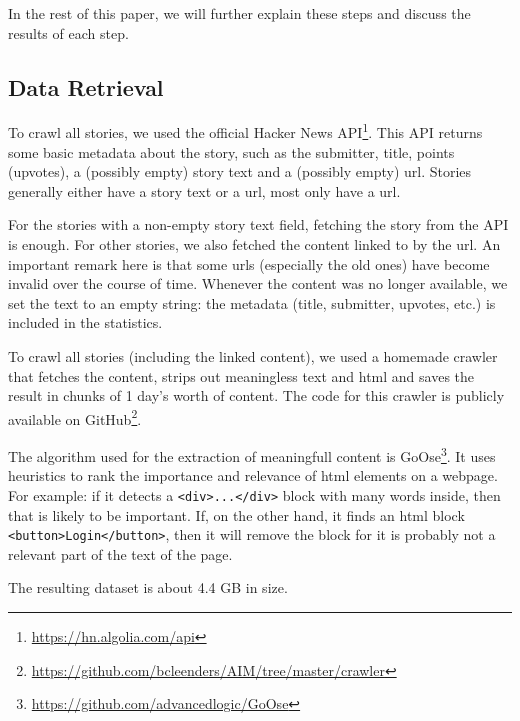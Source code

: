 In the rest of this paper, we will further explain these steps and discuss the results of each step.

\subsection{Data Retrieval}
To crawl all stories, we used the official Hacker News API\footnote{\url{https://hn.algolia.com/api}}. This API returns some basic metadata about the story, such as the submitter, title, points (upvotes), a (possibly empty) story text and a (possibly empty) url. Stories generally either have a story text or a url, most only have a url.

For the stories with a non-empty story text field, fetching the story from the API is enough. For other stories, we also fetched the content linked to by the url. An important remark here is that some urls (especially the old ones) have become invalid over the course of time. Whenever the content was no longer available, we set the text to an empty string: the metadata (title, submitter, upvotes, etc.) is included in the statistics.

To crawl all stories (including the linked content), we used a homemade crawler that fetches the content, strips out meaningless text and html and saves the result in chunks of 1 day's worth of content. The code for this crawler is publicly available on GitHub\footnote{\url{https://github.com/bcleenders/AIM/tree/master/crawler}}.

The algorithm used for the extraction of meaningfull content is GoOse\footnote{\url{https://github.com/advancedlogic/GoOse}}. It uses heuristics to rank the importance and relevance of html elements on a webpage. For example: if it detects a \texttt{<div>...</div>} block with many words inside, then that is likely to be important. If, on the other hand, it finds an html block \texttt{<button>Login</button>}, then it will remove the block for it is probably not a relevant part of the text of the page.

The resulting dataset is about 4.4 GB in size.

